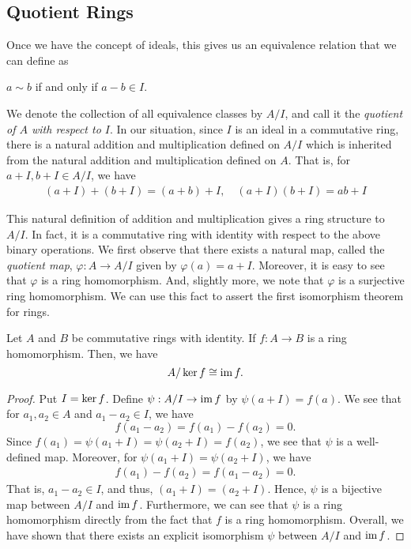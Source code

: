 \subsection{Quotient Rings}
Once we have the concept of ideals, this gives us an equivalence relation that we can define as 
\begin{displayquote}
    $a \sim b$ if and only if $a-b \in I$.
\end{displayquote} 
We denote the collection of all equivalence classes by $A / I$, and call it the {\it quotient of $A$ with respect to $I$}. In our situation, since $I$ is an ideal in a commutative ring, there is a natural addition and multiplication defined on $A/I$ which is inherited from the natural addition and multiplication defined on $A$. That is, for $a+ I,b+I \in A/I$, we have
\begin{align*}
    (a+I)+(b+I)=(a+b)+I, \quad (a+I)(b+I)=a b+I
\end{align*}

This natural definition of addition and multiplication gives a ring structure to $A / I$. In fact, it is a commutative ring with identity with respect to the above binary operations. We first observe that there exists a natural map, called the {\it quotient map}, $\varphi: A \rightarrow A / I$ given by $\varphi(a)=a+I$. Moreover, it is easy to see that $\varphi$ is a ring homomorphism. And, slightly more, we note that $\varphi$ is a surjective ring homomorphism. We can use this fact to assert the first isomorphism theorem for rings.
\begin{theorem}\label{thm: first-iso-ring}
    Let $A$ and $B$ be commutative rings with identity. If $f: A \rightarrow B$ is a ring homomorphism. Then, we have
    \[ A / \operatorname{\text{ker\/}}{f} \cong \operatorname{\text{im\/}}{f} .\]
\end{theorem}
\begin{proof}
    Put $I = \operatorname{\text{ker\/}}{f}$. Define $\psi  : A/I \to \operatorname{\text{im\/}}{f}$ by $\psi (a + I) = f(a)$. We see that for $a_1, a_2 \in A$ and $a_1 - a_2 \in I$, we have 
    \[f(a_1 - a_2) = f(a_1) - f(a_2) = 0.\]
    Since $f(a_1) = \psi(a_1+I) = \psi(a_2+I) = f(a_2)$, we see that $\psi$ is a well-defined map. Moreover, for $\psi(a_1+I) =  \psi(a_2+I)$, we have
    \begin{align*}
        f(a_1) - f(a_2) = f(a_1 - a_2) = 0.
    \end{align*}
    That is, $a_1 - a_2 \in I$, and thus, $(a_1+I) =  (a_2+I)$. Hence, $\psi$ is a bijective map between $A/I$ and $\operatorname{\text{im\/}}{f}$. Furthermore, we can see that $\psi$ is a ring homomorphism directly from the fact that $f$ is a ring homomorphism. Overall, we have shown that there exists an explicit isomorphism $\psi$ between $A / I$ and $\operatorname{\text{im\/}}{f}$.
\end{proof}
